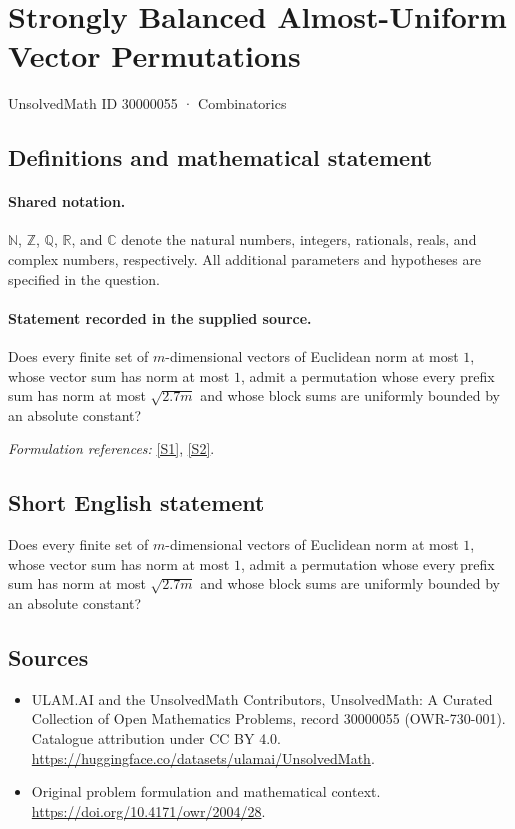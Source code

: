 \documentclass[11pt]{article}
\newcommand{\sref}[2]{\hyperlink{source:#1:#2}{[S#2]}}
\begin{document}
\setcounter{section}{30000054}
\section{Strongly Balanced Almost-Uniform Vector Permutations}\label{30000055}
{\small UnsolvedMath ID 30000055 · Combinatorics}
\subsection{Definitions and mathematical statement}

\paragraph{Shared notation.}$\mathbb N$, $\mathbb Z$, $\mathbb Q$, $\mathbb R$, and $\mathbb C$ denote the natural numbers, integers, rationals, reals, and complex numbers, respectively. All additional parameters and hypotheses are specified in the question.


\paragraph{Statement recorded in the supplied source.}
Does every finite set of $m$-dimensional vectors of Euclidean norm at most $1$, whose vector sum has norm at most $1$, admit a permutation whose every prefix sum has norm at most $\sqrt{2.7m}$ and whose block sums are uniformly bounded by an absolute constant?
\par\smallskip\textit{Formulation references:} \sref{30000055}{1}, \sref{30000055}{2}.
\subsection{Short English statement}
Does every finite set of $m$-dimensional vectors of Euclidean norm at most $1$, whose vector sum has norm at most $1$, admit a permutation whose every prefix sum has norm at most $\sqrt{2.7m}$ and whose block sums are uniformly bounded by an absolute constant?
\subsection{Sources}
\begin{itemize}
\item[\hypertarget{source:30000055:1}{S1}] ULAM.AI and the UnsolvedMath Contributors, UnsolvedMath: A Curated Collection of Open Mathematics Problems, record 30000055 (OWR-730-001). Catalogue attribution under CC BY 4.0.
\url{https://huggingface.co/datasets/ulamai/UnsolvedMath}.
\item[\hypertarget{source:30000055:2}{S2}] Original problem formulation and mathematical context.
\url{https://doi.org/10.4171/owr/2004/28}.
\end{itemize}
\label{end:30000055}
\end{document}
